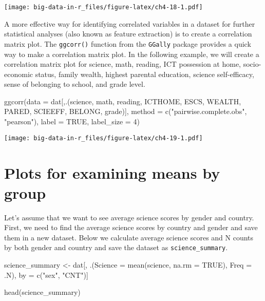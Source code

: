 \documentclass[
]{book}
\newenvironment{Shaded}{\begin{snugshade}}{\end{snugshade}}
\newcommand{\AttributeTok}[1]{\textcolor[rgb]{0.77,0.63,0.00}{#1}}
\newcommand{\ConstantTok}[1]{\textcolor[rgb]{0.00,0.00,0.00}{#1}}
\newcommand{\DecValTok}[1]{\textcolor[rgb]{0.00,0.00,0.81}{#1}}
\newcommand{\FunctionTok}[1]{\textcolor[rgb]{0.00,0.00,0.00}{#1}}
\newcommand{\NormalTok}[1]{#1}
\newcommand{\OtherTok}[1]{\textcolor[rgb]{0.56,0.35,0.01}{#1}}
\newcommand{\StringTok}[1]{\textcolor[rgb]{0.31,0.60,0.02}{#1}}
\begin{document}
\texttt{[image: big-data-in-r\_files/figure-latex/ch4-18-1.pdf]}

A more effective way for identifying correlated variables in a dataset for further statistical analyses (also known as feature extraction) is to create a correlation matrix plot. The \texttt{ggcorr()} function from the \texttt{GGally} package provides a quick way to make a correlation matrix plot. In the following example, we will create a correlation matrix plot for science, math, reading, ICT possession at home, socio-economic status, family wealth, highest parental education, science self-efficacy, sense of belonging to school, and grade level.

\begin{Shaded}
\begin{Highlighting}[]
\FunctionTok{ggcorr}\NormalTok{(}\AttributeTok{data =}\NormalTok{ dat[,.(science, math, reading, ICTHOME, ESCS,}
\NormalTok{                     WEALTH, PARED, SCIEEFF, BELONG, grade)],}
       \AttributeTok{method =} \FunctionTok{c}\NormalTok{(}\StringTok{"pairwise.complete.obs"}\NormalTok{, }\StringTok{"pearson"}\NormalTok{),}
       \AttributeTok{label =} \ConstantTok{TRUE}\NormalTok{, }\AttributeTok{label\_size =} \DecValTok{4}\NormalTok{)}
\end{Highlighting}
\end{Shaded}

\texttt{[image: big-data-in-r\_files/figure-latex/ch4-19-1.pdf]}

\hypertarget{plots-for-examining-means-by-group}{%
\section{Plots for examining means by group}\label{plots-for-examining-means-by-group}}

Let's assume that we want to see average science scores by gender and country. First, we need to find the average science scores by country and gender and save them in a new dataset. Below we calculate average science scores and N counts by both gender and country and save the dataset as \texttt{science\_summary}.

\begin{Shaded}
\begin{Highlighting}[]
\NormalTok{science\_summary }\OtherTok{\textless{}{-}}\NormalTok{ dat[, }
\NormalTok{                       .(}\AttributeTok{Science =} \FunctionTok{mean}\NormalTok{(science, }\AttributeTok{na.rm =} \ConstantTok{TRUE}\NormalTok{), }
                         \AttributeTok{Freq =}\NormalTok{ .N),}
\NormalTok{                       by }\OtherTok{=} \FunctionTok{c}\NormalTok{(}\StringTok{"sex"}\NormalTok{, }\StringTok{"CNT"}\NormalTok{)]}

\FunctionTok{head}\NormalTok{(science\_summary)}
\end{Highlighting}
\end{Shaded}
\end{document}
